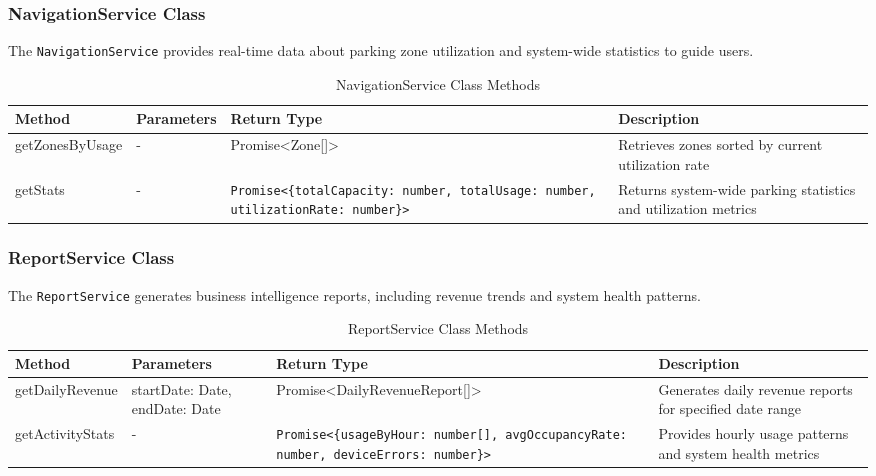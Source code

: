 \subsubsection{NavigationService Class}
The \texttt{NavigationService} provides real-time data about parking zone utilization and system-wide statistics to guide users.

\begin{table}[H]
\centering
\footnotesize
\renewcommand{\arraystretch}{1.3}
\begin{tabularx}{\textwidth}{|>{\RaggedRight\arraybackslash}X|>{\RaggedRight\arraybackslash}X|>{\RaggedRight\arraybackslash}X|>{\RaggedRight\arraybackslash}X|}
\hline
\textbf{Method} & \textbf{Parameters} & \textbf{Return Type} & \textbf{Description} \\
\hline
getZonesByUsage & - & Promise<Zone[]> & Retrieves zones sorted by current utilization rate \\
\hline
getStats & - & \texttt{Promise<\{totalCapacity: number, totalUsage: number, utilizationRate: number\}>} & Returns system-wide parking statistics and utilization metrics \\
\hline
\end{tabularx}
\caption{NavigationService Class Methods}
\label{tab:navigation-service-methods}
\end{table}

\subsubsection{ReportService Class}
The \texttt{ReportService} generates business intelligence reports, including revenue trends and system health patterns.

\begin{table}[H]
\centering
\footnotesize
\renewcommand{\arraystretch}{1.3}
\begin{tabularx}{\textwidth}{|>{\RaggedRight\arraybackslash}X|>{\RaggedRight\arraybackslash}X|>{\RaggedRight\arraybackslash}X|>{\RaggedRight\arraybackslash}X|}
\hline
\textbf{Method} & \textbf{Parameters} & \textbf{Return Type} & \textbf{Description} \\
\hline
getDailyRevenue & startDate: Date, endDate: Date & Promise<DailyRevenueReport[]> & Generates daily revenue reports for specified date range \\
\hline
getActivityStats & - & \texttt{Promise<\{usageByHour: number[], avgOccupancyRate: number, deviceErrors: number\}>} & Provides hourly usage patterns and system health metrics \\
\hline
\end{tabularx}
\caption{ReportService Class Methods}
\label{tab:report-service-methods}
\end{table}

